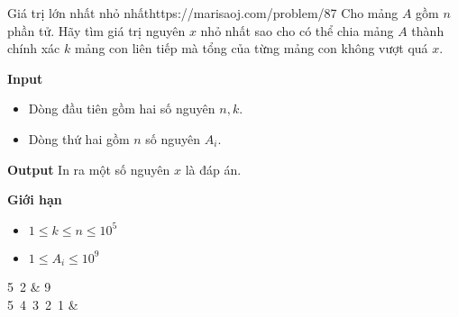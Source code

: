 \begin{baitap}{Giá trị lớn nhất nhỏ nhất}{https://marisaoj.com/problem/87}
Cho mảng $A$ gồm $n$ phần tử. Hãy tìm giá trị nguyên $x$ nhỏ nhất sao cho có thể chia mảng $A$ thành chính xác $k$ mảng con liên tiếp mà tổng của từng mảng con không vượt quá $x$.

\textbf{Input}
\begin{itemize}
    \item Dòng đầu tiên gồm hai số nguyên $n, k$.
    \item Dòng thứ hai gồm $n$ số nguyên $A_i$.
\end{itemize}

\textbf{Output}
In ra một số nguyên $x$ là đáp án.

\textbf{Giới hạn}
\begin{itemize}
    \item $1 \le k \le n \le 10^5$
    \item $1 \le A_i \le 10^9$
\end{itemize}

\begin{simple_example}
5\ 2 & 9 \\
5\ 4\ 3\ 2\ 1 & \\
\end{simple_example}
\end{baitap}
